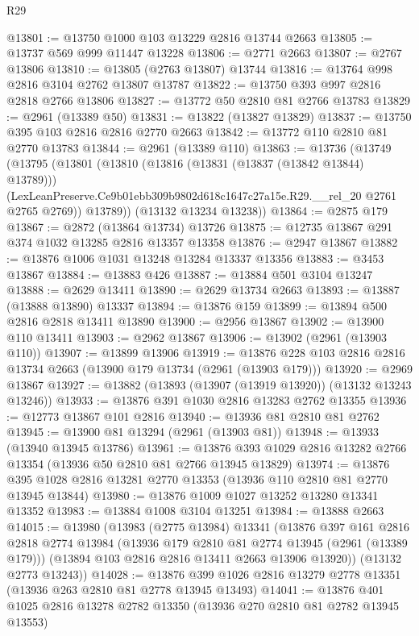 \begin{lexlean}{R29}
\begin{coremodule}
@13801 := @13750 @1000 @103 @13229 @2816 @13744 @2663
@13805 := @13737 @569 @999 @11447 @13228
@13806 := @2771 @2663
@13807 := @2767 @13806
@13810 := @13805 (@2763 @13807) @13744
@13816 := @13764 @998 @2816 @3104 @2762 @13807 @13787
@13822 := @13750 @393 @997 @2816 @2818 @2766 @13806
@13827 := @13772 @50 @2810 @81 @2766 @13783
@13829 := @2961 (@13389 @50)
@13831 := @13822 (@13827 @13829)
@13837 := @13750 @395 @103 @2816 @2816 @2770 @2663
@13842 := @13772 @110 @2810 @81 @2770 @13783
@13844 := @2961 (@13389 @110)
@13863 := @13736
    (@13749
      (@13795
        (@13801
          (@13810
            (@13816 (@13831 (@13837 (@13842 @13844) @13789)))
            (LexLeanPreserve.Ce9b01ebb309b9802d618c1647c27a15e.R29.__rel_20 @2761 @2765 @2769))
          @13789))
      (@13132 @13234 @13238))
@13864 := @2875 @179
@13867 := @2872 (@13864 @13734) @13726
@13875 := @12735 @13867 @291 @374 @1032 @13285 @2816 @13357 @13358
@13876 := @2947 @13867
@13882 := @13876 @1006 @1031 @13248 @13284 @13337 @13356
@13883 := @3453 @13867
@13884 := @13883 @426
@13887 := @13884 @501 @3104 @13247
@13888 := @2629 @13411
@13890 := @2629 @13734 @2663
@13893 := @13887 (@13888 @13890) @13337
@13894 := @13876 @159
@13899 := @13894 @500 @2816 @2818 @13411 @13890
@13900 := @2956 @13867
@13902 := @13900 @110 @13411
@13903 := @2962 @13867
@13906 := @13902 (@2961 (@13903 @110))
@13907 := @13899 @13906
@13919 := @13876 @228 @103 @2816 @2816 @13734 @2663 (@13900 @179 @13734 (@2961 (@13903 @179)))
@13920 := @2969 @13867
@13927 := @13882 (@13893 (@13907 (@13919 @13920)) (@13132 @13243 @13246))
@13933 := @13876 @391 @1030 @2816 @13283 @2762 @13355
@13936 := @12773 @13867 @101 @2816
@13940 := @13936 @81 @2810 @81 @2762
@13945 := @13900 @81 @13294 (@2961 (@13903 @81))
@13948 := @13933 (@13940 @13945 @13786)
@13961 := @13876 @393 @1029 @2816 @13282 @2766 @13354 (@13936 @50 @2810 @81 @2766 @13945 @13829)
@13974 := @13876 @395 @1028 @2816 @13281 @2770 @13353 (@13936 @110 @2810 @81 @2770 @13945 @13844)
@13980 := @13876 @1009 @1027 @13252 @13280 @13341 @13352
@13983 := @13884 @1008 @3104 @13251
@13984 := @13888 @2663
@14015 := @13980
    (@13983
      (@2775 @13984)
      @13341
      (@13876
        @397
        @161
        @2816
        @2818
        @2774
        @13984
        (@13936 @179 @2810 @81 @2774 @13945 (@2961 (@13389 @179)))
        (@13894 @103 @2816 @2816 @13411 @2663 @13906 @13920))
      (@13132 @2773 @13243))
@14028 := @13876 @399 @1026 @2816 @13279 @2778 @13351 (@13936 @263 @2810 @81 @2778 @13945 @13493)
@14041 := @13876 @401 @1025 @2816 @13278 @2782 @13350 (@13936 @270 @2810 @81 @2782 @13945 @13553)

\end{coremodule}
\end{lexlean}
